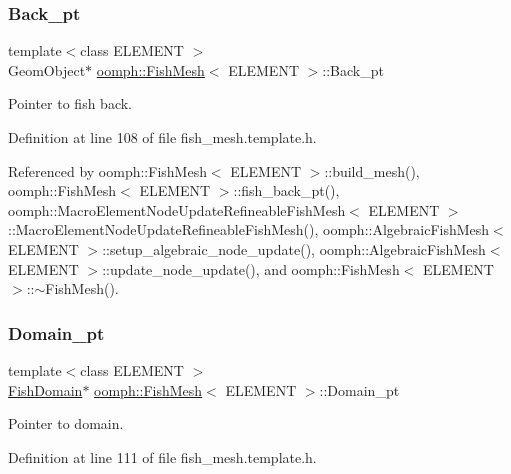 \subsubsection{\texorpdfstring{Back\+\_\+pt}{Back\_pt}}
{\footnotesize\ttfamily template$<$class E\+L\+E\+M\+E\+NT $>$ \\
Geom\+Object$\ast$ \hyperlink{classoomph_1_1FishMesh}{oomph\+::\+Fish\+Mesh}$<$ E\+L\+E\+M\+E\+NT $>$\+::Back\+\_\+pt\hspace{0.3cm}{\ttfamily [protected]}}



Pointer to fish back. 



Definition at line 108 of file fish\+\_\+mesh.\+template.\+h.



Referenced by oomph\+::\+Fish\+Mesh$<$ E\+L\+E\+M\+E\+N\+T $>$\+::build\+\_\+mesh(), oomph\+::\+Fish\+Mesh$<$ E\+L\+E\+M\+E\+N\+T $>$\+::fish\+\_\+back\+\_\+pt(), oomph\+::\+Macro\+Element\+Node\+Update\+Refineable\+Fish\+Mesh$<$ E\+L\+E\+M\+E\+N\+T $>$\+::\+Macro\+Element\+Node\+Update\+Refineable\+Fish\+Mesh(), oomph\+::\+Algebraic\+Fish\+Mesh$<$ E\+L\+E\+M\+E\+N\+T $>$\+::setup\+\_\+algebraic\+\_\+node\+\_\+update(), oomph\+::\+Algebraic\+Fish\+Mesh$<$ E\+L\+E\+M\+E\+N\+T $>$\+::update\+\_\+node\+\_\+update(), and oomph\+::\+Fish\+Mesh$<$ E\+L\+E\+M\+E\+N\+T $>$\+::$\sim$\+Fish\+Mesh().

\mbox{\label{classoomph_1_1FishMesh_ae18c3154ad99054c073840c6b134c49b}} 
\subsubsection{\texorpdfstring{Domain\+\_\+pt}{Domain\_pt}}
{\footnotesize\ttfamily template$<$class E\+L\+E\+M\+E\+NT $>$ \\
\hyperlink{classoomph_1_1FishDomain}{Fish\+Domain}$\ast$ \hyperlink{classoomph_1_1FishMesh}{oomph\+::\+Fish\+Mesh}$<$ E\+L\+E\+M\+E\+NT $>$\+::Domain\+\_\+pt\hspace{0.3cm}{\ttfamily [protected]}}



Pointer to domain. 



Definition at line 111 of file fish\+\_\+mesh.\+template.\+h.



